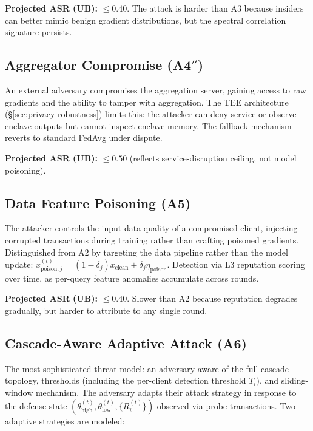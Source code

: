 \documentclass[10pt,journal]{IEEEtran}
\begin{document}
\textbf{Projected ASR (UB):} $\le 0.40$. The attack is harder than A3 because insiders can better mimic benign gradient distributions, but the spectral correlation signature persists.

\subsection{Aggregator Compromise (A4$''$)}\label{sec:attack-aggregator}

An external adversary compromises the aggregation server, gaining access to raw gradients and the ability to tamper with aggregation. The TEE architecture (\S\ref{sec:privacy-robustness}) limits this: the attacker can deny service or observe enclave outputs but cannot inspect enclave memory. The fallback mechanism reverts to standard FedAvg under dispute.

\textbf{Projected ASR (UB):} $\le 0.50$ (reflects service-disruption ceiling, not model poisoning).

\subsection{Data Feature Poisoning (A5)}\label{sec:attack-feature}

The attacker controls the input data quality of a compromised client, injecting corrupted transactions during training rather than crafting poisoned gradients. Distinguished from A2 by targeting the data pipeline rather than the model update: $x_{\text{poison},j}^{(t)} = (1-\delta_j) x_{\text{clean}} + \delta_j \eta_{\text{poison}}$. Detection via L3 reputation scoring over time, as per-query feature anomalies accumulate across rounds.

\textbf{Projected ASR (UB):} $\le 0.40$. Slower than A2 because reputation degrades gradually, but harder to attribute to any single round.

\subsection{Cascade-Aware Adaptive Attack (A6)}\label{sec:attack-adaptive}

The most sophisticated threat model: an adversary aware of the full cascade topology, thresholds (including the per-client detection threshold $T_i$), and sliding-window mechanism. The adversary adapts their attack strategy in response to the defense state $(\theta_{\text{high}}^{(t)}, \theta_{\text{low}}^{(t)}, \{R_i^{(t)}\})$ observed via probe transactions. Two adaptive strategies are modeled:
\end{document}
